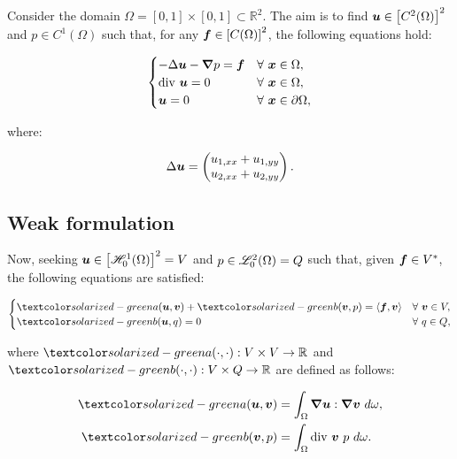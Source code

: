 Consider the domain $\Omega = [0, 1] \times [0, 1] \subset \mathbb{R}^2$. The aim is to find $\bm{u} \in \left[ C^2(\Omega) \right]^2$ and $p \in C^1(\Omega)$ such that, for any $\bm{f} \in \left[ C(\Omega) \right]^2$, the following equations hold:

\begin{gather}
    \begin{cases} \label{strong_stokes}
        - \Delta \bm{u} - \bm{\nabla} p = \bm{f} & \forall ~ \bm{x} \in \Omega, \\
        \text{div } \bm{u} = 0 & \forall ~ \bm{x} \in \Omega, \\
        \bm{u} = 0 & \forall ~ \bm{x} \in \partial \Omega,
    \end{cases}
\end{gather}

where:

\begin{gather}
    \Delta \bm{u} = \begin{pmatrix}
        u_{1, xx} + u_{1, yy} \\
        u_{2, xx} + u_{2, yy}
    \end{pmatrix} .
\end{gather}

\subsection{Weak formulation}

Now, seeking $\bm{u} \in \left[ \mathscr{H}^1_0(\Omega) \right]^2 = V$ and $p \in \mathscr{L}^2_0(\Omega) = Q$ such that, given $\bm{f} \in V^*$, the following equations are satisfied:

\begin{gather} \label{weak_stokes}
    \begin{cases}
        \boa{\Vector{u}}{\Vector{v}} + \bob{\Vector{v}}{p} = \langle \Vector{f}, \Vector{v} \rangle & \Forall \Vector{v} \in V,\\
        \bob{\Vector{u}}{q} = 0 & \Forall q \in Q,
    \end{cases}
\end{gather}

where $\boa{\cdot}{\cdot}: V \times V \rightarrow \mathbb{R}$ and $\bob{\cdot}{\cdot}: V \times Q \rightarrow \mathbb{R}$ are defined as follows:

\begin{align}
    \boa{\Vector{u}}{\Vector{v}} &= \int_{\Omega} \grad \Vector{u} : \grad \Vector{v} ~ d \omega, \label{a} \\
    \bob{\Vector{v}}{p} &= \int_{\Omega} \diver \Vector{v} ~ p ~ d \omega. \label{b}
\end{align}

